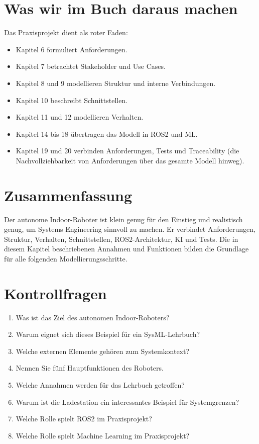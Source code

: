\section{Was wir im Buch daraus machen}
Das Praxisprojekt dient als roter Faden:

\begin{itemize}
    \item Kapitel 6 formuliert Anforderungen.
    \item Kapitel 7 betrachtet Stakeholder und Use Cases.
    \item Kapitel 8 und 9 modellieren Struktur und interne Verbindungen.
    \item Kapitel 10 beschreibt Schnittstellen.
    \item Kapitel 11 und 12 modellieren Verhalten.
    \item Kapitel 14 bis 18 übertragen das Modell in ROS2 und ML.
    \item Kapitel 19 und 20 verbinden Anforderungen, Tests und Traceability (die Nachvollziehbarkeit von Anforderungen über das gesamte Modell hinweg).
\end{itemize}

\section{Zusammenfassung}
Der autonome Indoor-Roboter ist klein genug für den Einstieg und realistisch genug, um Systems Engineering sinnvoll zu machen. Er verbindet Anforderungen, Struktur, Verhalten, Schnittstellen, ROS2-Architektur, KI und Tests. Die in diesem Kapitel beschriebenen Annahmen und Funktionen bilden die Grundlage für alle folgenden Modellierungsschritte.

\section{Kontrollfragen}
\begin{enumerate}
    \item Was ist das Ziel des autonomen Indoor-Roboters?
    \item Warum eignet sich dieses Beispiel für ein SysML-Lehrbuch?
    \item Welche externen Elemente gehören zum Systemkontext?
    \item Nennen Sie fünf Hauptfunktionen des Roboters.
    \item Welche Annahmen werden für das Lehrbuch getroffen?
    \item Warum ist die Ladestation ein interessantes Beispiel für Systemgrenzen?
    \item Welche Rolle spielt ROS2 im Praxisprojekt?
    \item Welche Rolle spielt Machine Learning im Praxisprojekt?
\end{enumerate}

